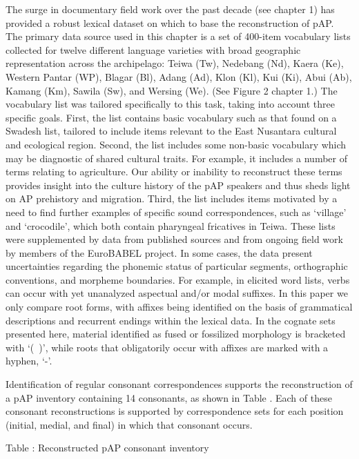 The surge in documentary field work over the past decade (see chapter 1) has provided a robust lexical dataset on which to base the reconstruction of pAP. The primary data source used in this chapter is a set of 400-item vocabulary lists collected for twelve different language varieties with broad geographic representation across the archipelago: Teiwa (Tw), Nedebang (Nd), Kaera (Ke), Western Pantar (WP), Blagar (Bl), Adang (Ad), Klon (Kl), Kui (Ki), Abui (Ab), Kamang (Km), Sawila (Sw), and Wersing (We). (See Figure 2 chapter 1.) The vocabulary list was tailored specifically to this task, taking into account three specific goals. First, the list contains basic vocabulary such as that found on a Swadesh list, tailored to include items relevant to the East Nusantara cultural and ecological region. Second, the list includes some non-basic vocabulary which may be diagnostic of shared cultural traits. For example, it includes a number of terms relating to agriculture. Our ability or inability to reconstruct these 
terms provides insight into the culture history of the pAP speakers and thus sheds light on AP prehistory and migration. Third, the list includes items motivated by a need to find further examples of specific sound correspondences, such as {\textquoteleft}village{\textquoteright} and {\textquoteleft}crocodile{\textquoteright}, which both contain pharyngeal fricatives in Teiwa. These lists were supplemented by data from published sources and from ongoing field work by members of the EuroBABEL project. In some cases, the data present uncertainties regarding the phonemic status of particular segments, orthographic conventions, and morpheme boundaries. For example, in elicited word lists, verbs can occur with yet unanalyzed aspectual and/or modal suffixes. In this paper we only compare root forms, with affixes being identified on the basis of grammatical descriptions and recurrent endings within the lexical data. In the cognate sets presented here, material identified as fused or fossilized morphology is 
bracketed with {\textquoteleft}(~){\textquoteright}, while roots that obligatorily occur with affixes are marked with a hyphen, {\textquoteleft}-{\textquoteright}. 

Identification of regular consonant correspondences supports the reconstruction of a pAP inventory containing 14 consonants, as shown in Table . Each of these consonant reconstructions is supported by correspondence sets for each position (initial, medial, and final) in which that consonant occurs. 

{\centering
\label{bkm:Ref213888527}Table : Reconstructed pAP consonant inventory
\par}

